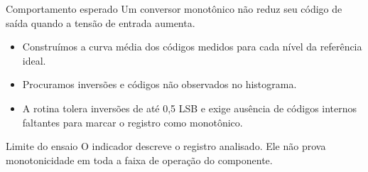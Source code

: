 \begin{block}{Comportamento esperado}
Um conversor monotônico não reduz seu código de saída quando a tensão de entrada aumenta.
\end{block}
\begin{itemize}
\item Construímos a curva média dos códigos medidos para cada nível da referência ideal.
\item Procuramos inversões e códigos não observados no histograma.
\item A rotina tolera inversões de até 0,5 LSB e exige ausência de códigos internos faltantes para marcar o registro como monotônico.
\end{itemize}
\begin{alertblock}{Limite do ensaio}
O indicador descreve o registro analisado. Ele não prova monotonicidade em toda a faixa de operação do componente.
\end{alertblock}
